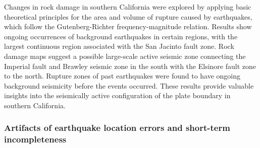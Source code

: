 \documentclass[12pt]{article} %
\theoremstyle{plain}
\begin{document}
	
	
	Changes in rock damage in southern California were explored by applying basic theoretical principles for the area and volume of rupture caused by earthquakes, which follow the Gutenberg-Richter frequency-magnitude relation. Results show ongoing occurrences of background earthquakes in certain regions, with the largest continuous region associated with the San Jacinto fault zone. Rock damage maps suggest a possible large-scale active seismic zone connecting the Imperial fault and Brawley seismic zone in the south with the Elsinore fault zone to the north. Rupture zones of past earthquakes were found to have ongoing background seismicity before the events occurred. These results provide valuable insights into the seismically active configuration of the plate boundary in southern California.
		
	\subsubsection{Artifacts of earthquake location errors and short-term incompleteness}
	
\end{document}
